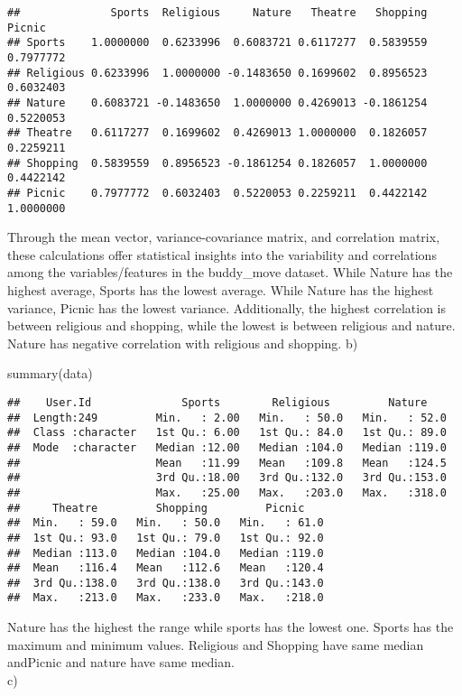 \documentclass[
]{article}
\newenvironment{Shaded}{\begin{snugshade}}{\end{snugshade}}
\newcommand{\FunctionTok}[1]{\textcolor[rgb]{0.00,0.00,0.00}{#1}}
\newcommand{\NormalTok}[1]{#1}
\begin{document}
\begin{verbatim}
##              Sports  Religious     Nature   Theatre   Shopping    Picnic
## Sports    1.0000000  0.6233996  0.6083721 0.6117277  0.5839559 0.7977772
## Religious 0.6233996  1.0000000 -0.1483650 0.1699602  0.8956523 0.6032403
## Nature    0.6083721 -0.1483650  1.0000000 0.4269013 -0.1861254 0.5220053
## Theatre   0.6117277  0.1699602  0.4269013 1.0000000  0.1826057 0.2259211
## Shopping  0.5839559  0.8956523 -0.1861254 0.1826057  1.0000000 0.4422142
## Picnic    0.7977772  0.6032403  0.5220053 0.2259211  0.4422142 1.0000000
\end{verbatim}

Through the mean vector, variance-covariance matrix, and correlation
matrix, these calculations offer statistical insights into the
variability and correlations among the variables/features in the
buddy\_move dataset. While Nature has the highest average, Sports has
the lowest average. While Nature has the highest variance, Picnic has
the lowest variance. Additionally, the highest correlation is between
religious and shopping, while the lowest is between religious and
nature. Nature has negative correlation with religious and shopping. b)

\begin{Shaded}
\begin{Highlighting}[]
\FunctionTok{summary}\NormalTok{(data)}
\end{Highlighting}
\end{Shaded}

\begin{verbatim}
##    User.Id              Sports        Religious         Nature     
##  Length:249         Min.   : 2.00   Min.   : 50.0   Min.   : 52.0  
##  Class :character   1st Qu.: 6.00   1st Qu.: 84.0   1st Qu.: 89.0  
##  Mode  :character   Median :12.00   Median :104.0   Median :119.0  
##                     Mean   :11.99   Mean   :109.8   Mean   :124.5  
##                     3rd Qu.:18.00   3rd Qu.:132.0   3rd Qu.:153.0  
##                     Max.   :25.00   Max.   :203.0   Max.   :318.0  
##     Theatre         Shopping         Picnic     
##  Min.   : 59.0   Min.   : 50.0   Min.   : 61.0  
##  1st Qu.: 93.0   1st Qu.: 79.0   1st Qu.: 92.0  
##  Median :113.0   Median :104.0   Median :119.0  
##  Mean   :116.4   Mean   :112.6   Mean   :120.4  
##  3rd Qu.:138.0   3rd Qu.:138.0   3rd Qu.:143.0  
##  Max.   :213.0   Max.   :233.0   Max.   :218.0
\end{verbatim}

Nature has the highest the range while sports has the lowest one. Sports
has the maximum and minimum values. Religious and Shopping have same
median andPicnic and nature have same median.\\
c)
\end{document}

